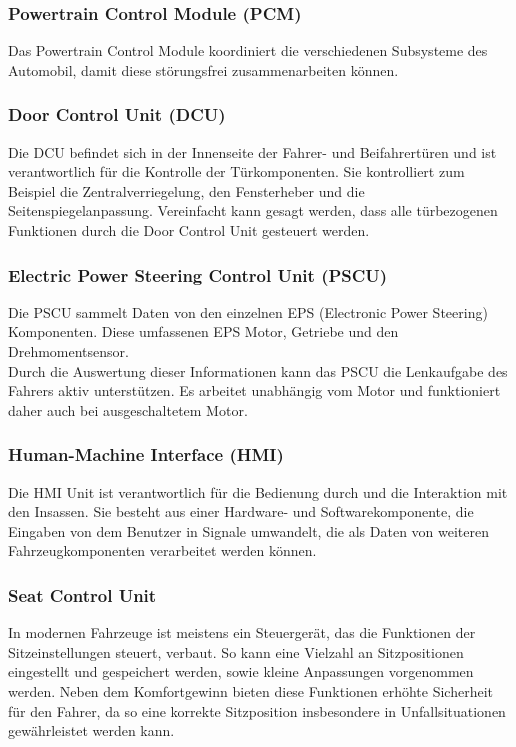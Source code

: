         \subsubsection{Powertrain Control Module (PCM)}
        Das Powertrain Control Module koordiniert die verschiedenen Subsysteme des Automobil, damit diese störungsfrei zusammenarbeiten können.
        \cite{PCM.PB1}

        \subsubsection{Door Control Unit (DCU)}
        Die DCU befindet sich in der Innenseite der Fahrer- und Beifahrertüren und ist verantwortlich für die
        Kontrolle der Türkomponenten. Sie kontrolliert zum Beispiel die Zentralverriegelung, den Fensterheber und die Seitenspiegelanpassung. 
        Vereinfacht kann gesagt werden, dass alle türbezogenen Funktionen durch die Door Control Unit gesteuert werden.
        ~\cite{doorcontrol.PB1} ~\cite{doorcontrol.PB2}

        \subsubsection{Electric Power Steering Control Unit (PSCU)}
        Die PSCU sammelt Daten von den einzelnen EPS (Electronic Power Steering) Komponenten. Diese umfassenen EPS Motor,
        Getriebe und den Drehmomentsensor.\\ Durch die Auswertung dieser Informationen kann das PSCU die Lenkaufgabe des
        Fahrers aktiv unterstützen. Es arbeitet unabhängig vom Motor und funktioniert daher auch bei ausgeschaltetem Motor.
        \cite{PSCU.PB1}

        \subsubsection{Human-Machine Interface (HMI)}
        Die HMI Unit ist verantwortlich für die Bedienung durch und die Interaktion mit den Insassen. Sie besteht aus einer
        Hardware- und Softwarekomponente, die Eingaben von dem Benutzer in Signale umwandelt, die als Daten von weiteren Fahrzeugkomponenten
        verarbeitet werden können.
        \cite{HMI.PB1} \cite{HMI.PB2}

        \subsubsection{Seat Control Unit}
        In modernen Fahrzeuge ist meistens ein Steuergerät, das die Funktionen der Sitzeinstellungen steuert, verbaut.
        So kann eine Vielzahl an Sitzpositionen eingestellt und gespeichert werden, sowie kleine Anpassungen vorgenommen werden.
        Neben dem Komfortgewinn bieten diese Funktionen erhöhte Sicherheit für den Fahrer, da so eine korrekte Sitzposition insbesondere in
        Unfallsituationen gewährleistet werden kann.
        \cite{seatcontrol.PB1} \cite{seatcontrol.PB2} 

